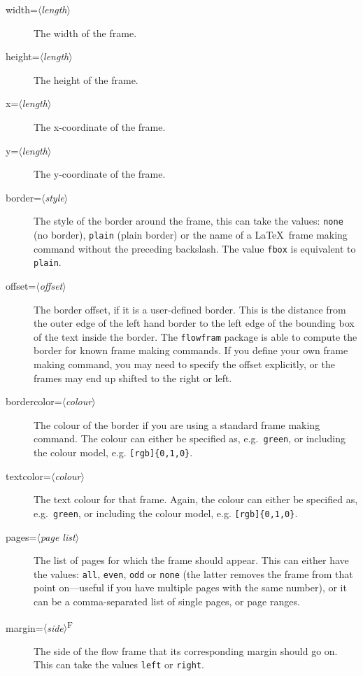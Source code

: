 \documentclass[a4paper,twoside]{report}
\newcommand{\sty}[1]{\texttt{#1}}
\newcommand{\meta}[1]{$\langle$\emph{#1}$\rangle$}
\begin{document}
\begin{description}
\item[width=\meta{length}]  The width of the frame.

\item[height=\meta{length}] The height of the frame.

\item[x=\meta{length}] The x-coordinate of the frame.

\item[y=\meta{length}] The y-coordinate of the frame.

\item[border=\meta{style}] The style of the border around the 
frame, this can take the values: \texttt{none} (no border),
\texttt{plain} (plain border) or the name of a \LaTeX\ 
frame making command without the preceding backslash. 
The value \texttt{fbox} is equivalent to \texttt{plain}.

\item[offset=\meta{offset}] The border offset, if it is a 
user-defined border.  This is the distance from the outer
edge of the left hand border to the left edge of the
bounding box of the text inside the border.  The \sty{flowfram}
package is able to compute the border for 
known frame making commands. 
If you define your own frame making command, you may need to 
specify the offset explicitly, or the frames 
may end up shifted to the right or left.

\item[bordercolor=\meta{colour}] The colour of the border
if you are using a standard frame making command.
The colour can either be specified as, e.g.\ \texttt{green},
or including the colour model, e.g. \verb/[rgb]{0,1,0}/.

\item[textcolor=\meta{colour}] The text colour for that 
frame. Again, the colour can either be specified as, 
e.g.\ \texttt{green}, or including the colour model, 
e.g. \verb/[rgb]{0,1,0}/.

\item[pages=\meta{page list}] The {list of 
pages} for which the frame
should appear. This can either have the values: \texttt{all},
\texttt{even}, \texttt{odd} or \texttt{none} (the latter 
removes the frame from that point on---useful if you
have multiple pages with the same number), or it can be a 
comma-separated list of single pages, or 
{page ranges}.

\item[margin=\meta{side}\textsuperscript{F}] The side of
the flow frame that its corresponding margin should go on. This
can take the values \texttt{left} or \texttt{right}.


\end{description}
\end{document}
